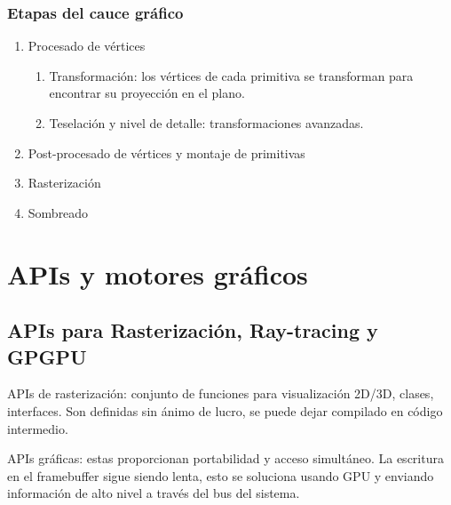 \documentclass[12pt]{report} %
\providecommand{\tightlist}{%
  \setlength{\itemsep}{0pt}\setlength{\parskip}{0pt}}
\begin{document}
\hypertarget{etapas-del-cauce-gruxe1fico}{%
\subsubsection{Etapas del cauce
gráfico}\label{etapas-del-cauce-gruxe1fico}}

\begin{enumerate}
\def\labelenumi{\arabic{enumi}.}
\tightlist
\item
  Procesado de vértices

  \begin{enumerate}
  \def\labelenumii{\arabic{enumii}.}
  \tightlist
  \item
    Transformación: los vértices de cada primitiva se transforman para
    encontrar su proyección en el plano.\\
  \item
    Teselación y nivel de detalle: transformaciones avanzadas.\\
  \end{enumerate}
\item
  Post-procesado de vértices y montaje de primitivas\\
\item
  Rasterización\\
\item
  Sombreado
\end{enumerate}


\hypertarget{apis-y-motores-gruxe1ficos}{%
\section{APIs y motores gráficos}\label{apis-y-motores-gruxe1ficos}}

\hypertarget{apis-para-rasterizaciuxf3n-ray-tracing-y-gpgpu}{%
\subsection{APIs para Rasterización, Ray-tracing y
GPGPU}\label{apis-para-rasterizaciuxf3n-ray-tracing-y-gpgpu}}

APIs de rasterización: conjunto de funciones para visualización 2D/3D,
clases, interfaces. Son definidas sin ánimo de lucro, se puede dejar
compilado en código intermedio.

APIs gráficas: estas proporcionan portabilidad y acceso simultáneo. La
escritura en el framebuffer sigue siendo lenta, esto se soluciona usando
GPU y enviando información de alto nivel a través del bus del sistema.
\end{document}
